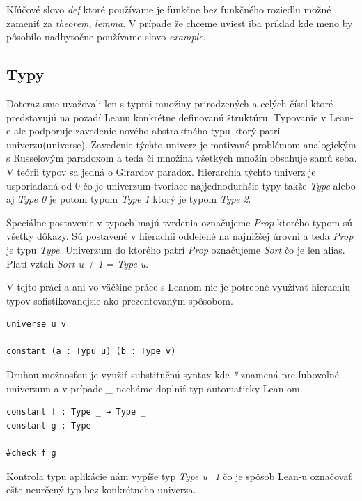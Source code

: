 \documentclass[a4paper,10pt,oneside]{report}%
\begin{document}
    Kľúčové slovo \emph{def} ktoré používame je funkčne bez funkčného roziedlu možné
zameniť za \emph{theorem}, \emph{lemma}. V prípade že chceme uviesť iba príklad
kde meno by pôsobilo nadbytočne používame slovo \emph{example}.

\subsection{Typy}
    Doteraz sme uvažovali len s typmi množiny prirodzených a celých čísel
ktoré predstavujú na pozadí Leanu konkrétne definovanú štruktúru.
    Typovanie v Lean-e ale podporuje zavedenie nového abstraktného typu ktorý patrí univerzu(universe).
    Zavedenie týchto univerz je motivané problémom analogickým s Russelovým paradoxom 
a teda či množina všetkých množín obsahuje samú seba.
    V teórii typov sa jedná o Girardov paradox.
    Hierarchia týchto univerz je usporiadaná od 0 čo je univerzum tvoriace najjednoduchšie
typy takže \emph{Type} alebo aj \emph{Type 0} je potom typom \emph{Type 1} ktorý
je typom \emph{Type 2}.

    Špeciálne postavenie v typoch majú tvrdenia označujeme \emph{Prop} ktorého
typom sú všetky dôkazy.
    Sú postavené v hierachii oddelené na najnižšej úrovni a teda \emph{Prop} je 
typu \emph{Type}.
    Univerzum do ktorého patrí \emph{Prop} označujeme \emph{Sort} čo je len 
alias.
Platí vzťah \emph{Sort u + 1} = \emph{Type u}.

V tejto práci a ani vo väčšine práce s Leanom nie je potrebné využívať hierachiu
    typov sofistikovanejsie ako prezentovaným spôsobom.
\begin{lstlisting}
universe u v

constant (a : Typu u) (b : Type v)
\end{lstlisting}
Druhou možnosťou je využiť substitučnú syntax kde \emph{*} znamená pre ľubovoľné univerzum
a v prípade \emph{\_} necháme doplniť typ automaticky Lean-om.
\begin{lstlisting}
constant f : Type _ → Type _
constant g : Type

#check f g
\end{lstlisting}
    Kontrola typu aplikácie nám vypíše typ \emph{Type u\_1} čo je spôsob Lean-u označovať
ešte neurčený typ bez konkrétneho univerza.
\end{document}
